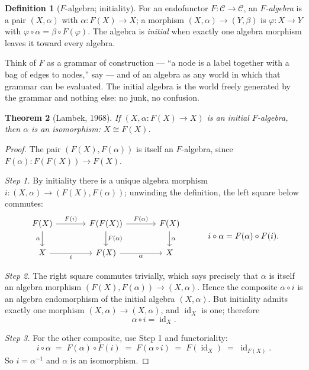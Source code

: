 \documentclass[11pt]{article}
\theoremstyle{plain}
\newtheorem{theorem}{Theorem}[section]
\theoremstyle{definition}
\newtheorem{definition}[theorem]{Definition}
\theoremstyle{remark}
\newcommand{\C}{\mathcal{C}}
\newcommand{\id}{\operatorname{id}}
\begin{document}
\begin{definition}[$F$-algebra; initiality]
For an endofunctor $F\colon \C \to \C$, an \emph{$F$-algebra} is a pair $(X, \alpha)$ with $\alpha\colon F(X) \to X$; a morphism $(X,\alpha) \to (Y,\beta)$ is $\varphi\colon X \to Y$ with $\varphi \circ \alpha = \beta \circ F(\varphi)$. The algebra is \emph{initial} when exactly one algebra morphism leaves it toward every algebra.
\end{definition}

Think of $F$ as a grammar of construction --- ``a node is a label together with a bag of edges to nodes,'' say --- and of an algebra as any world in which that grammar can be evaluated. The initial algebra is the world freely generated by the grammar and nothing else: no junk, no confusion.

\begin{theorem}[Lambek, 1968]\label{thm:lambek}
If $(X, \alpha\colon F(X) \to X)$ is an initial $F$-algebra, then $\alpha$ is an isomorphism: $X \cong F(X)$.
\end{theorem}

\begin{proof}
The pair $(F(X), F(\alpha))$ is itself an $F$-algebra, since $F(\alpha)\colon F(F(X)) \to F(X)$.

\emph{Step 1.} By initiality there is a unique algebra morphism $i\colon (X,\alpha) \to (F(X), F(\alpha))$; unwinding the definition, the left square below commutes:
\[
\begin{tikzcd}[column sep=large]
F(X) \arrow[r, "F(i)"] \arrow[d, "\alpha"'] & F(F(X)) \arrow[r, "F(\alpha)"] \arrow[d, "F(\alpha)"] & F(X) \arrow[d, "\alpha"] \\
X \arrow[r, "i"'] & F(X) \arrow[r, "\alpha"'] & X
\end{tikzcd}
\qquad\quad
i \circ \alpha = F(\alpha)\circ F(i).
\]

\emph{Step 2.} The right square commutes trivially, which says precisely that $\alpha$ is itself an algebra morphism $(F(X),F(\alpha)) \to (X,\alpha)$. Hence the composite $\alpha \circ i$ is an algebra endomorphism of the initial algebra $(X,\alpha)$. But initiality admits exactly one morphism $(X,\alpha) \to (X,\alpha)$, and $\id_X$ is one; therefore
\[
\alpha \circ i = \id_X .
\]

\emph{Step 3.} For the other composite, use Step 1 and functoriality:
\[
i \circ \alpha \;=\; F(\alpha) \circ F(i) \;=\; F(\alpha \circ i) \;=\; F(\id_X) \;=\; \id_{F(X)} .
\]
So $i = \alpha^{-1}$ and $\alpha$ is an isomorphism.
\end{proof}
\end{document}
